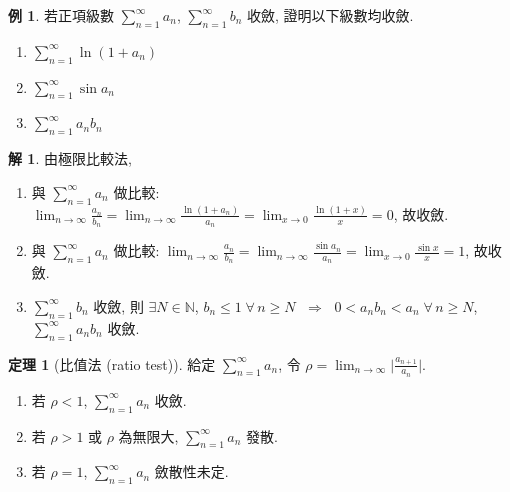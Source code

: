 \documentclass[12pt]{extarticle}
\newcommand{\ds}{\displaystyle}
\newcommand{\ie}{\;\Longrightarrow\;}
\theoremstyle{definition}
\newtheorem*{thm}{定理}
\newtheorem*{ex}{例}
\newtheorem*{sol}{解}
\begin{document}
\begin{ex} 若正項級數 $\ds\sum_{n = 1}^\infty a_n$, $\ds\sum_{n = 1}^\infty b_n$ 收斂, 證明以下級數均收斂. 
  \begin{multicols}{3}
    \begin{enumerate}\setlength{\itemsep}{0pt}
      \item $\ds\sum_{n = 1}^\infty\ln(1 + a_n)$
      \item $\ds\sum_{n = 1}^\infty\sin a_n$
      \item $\ds\sum_{n = 1}^\infty a_n b_n$
    \end{enumerate}
  \end{multicols}
\end{ex}

\begin{sol} 由極限比較法, 
  \begin{enumerate}\setlength{\itemsep}{0pt}
    \item 與 $\ds\sum_{n = 1}^\infty a_n$ 做比較: $\ds\lim_{n\to\infty}\frac{a_n}{b_n} = \lim_{n\to\infty}\frac{\ln(1 + a_n)}{a_n} = \lim_{x\to 0}\frac{\ln(1 + x)}{x} = 0$, 故收斂. 
    \item 與 $\ds\sum_{n = 1}^\infty a_n$ 做比較: $\ds\lim_{n\to\infty}\frac{a_n}{b_n} = \lim_{n\to\infty}\frac{\sin a_n}{a_n} = \lim_{x\to 0}\frac{\sin x}{x} = 1$, 故收斂. 
    \item $\ds\sum_{n = 1}^\infty b_n$ 收斂, 則 $\ds\exists N\in\mathbb{N}$, $\ds b_n\leqslant 1\;\forall\,n\geqslant N$ $\ie$ $\ds 0 < a_n b_n < a_n\;\forall\,n\geqslant N$, $\ds\sum_{n = 1}^\infty a_n b_n$ 收斂. 
  \end{enumerate}
\end{sol}

\begin{thm}[比值法 (ratio test)]
  給定 $\ds\sum_{n = 1}^\infty a_n$, 令 $\ds\rho = \lim_{n\to\infty}\bigg|\frac{a_{n + 1}}{a_n}\bigg|$. 
  \begin{multicols}{2}
    \begin{enumerate}\setlength{\itemsep}{0pt}
      \item 若 $\ds\rho < 1$, $\ds\sum_{n = 1}^\infty a_n$ 收斂. 
      \item 若 $\ds\rho > 1$ 或 $\ds\rho$ 為無限大, $\ds\sum_{n = 1}^\infty a_n$ 發散. 
      \item 若 $\ds\rho = 1$, $\ds\sum_{n = 1}^\infty a_n$ 斂散性未定. 
    \end{enumerate}
  \end{multicols}
\end{thm}
\end{document}
